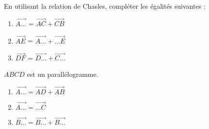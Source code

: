 
En utilisant la relation de Chasles, compléter les égalités suivantes :
\begin{enumerate}
 \item 
$\overrightarrow{A\ldots}$ =  $\overrightarrow{AC}+\overrightarrow{CB}$ 
  \item $\overrightarrow{AE}$ = $\overrightarrow{A\ldots}+\overrightarrow{\ldots E}$ 
   \item  $\overrightarrow{DF}$ = $\overrightarrow{D\ldots}+\overrightarrow{C\ldots}$                   
\end{enumerate} 
    
 $ABCD$ est un parallélogramme.   
 \begin{enumerate}   
  \item  $\overrightarrow{A\ldots}=\overrightarrow{AD}+\overrightarrow{AB}$                   
   \item  $\overrightarrow{A\ldots} =\overrightarrow{\ldots C}$                   
    \item  $\overrightarrow{B\ldots}=\overrightarrow{B\ldots}+\overrightarrow{B\ldots}$                   
  
 \end{enumerate} 